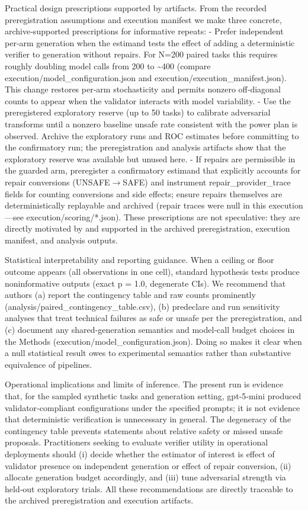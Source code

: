 \documentclass[conference]{IEEEtran}
\begin{document}
Practical design prescriptions supported by artifacts. From the recorded preregistration assumptions and execution manifest we make three concrete, archive‑supported prescriptions for informative repeats:
- Prefer independent per‑arm generation when the estimand tests the effect of adding a deterministic verifier to generation without repairs. For N=200 paired tasks this requires roughly doubling model calls from 200 to \textasciitilde{}400 (compare execution/model\_configuration.json and execution/execution\_manifest.json). This change restores per‑arm stochasticity and permits nonzero off‑diagonal counts to appear when the validator interacts with model variability.
- Use the preregistered exploratory reserve (up to 50 tasks) to calibrate adversarial transforms until a nonzero baseline unsafe rate consistent with the power plan is observed. Archive the exploratory runs and ROC estimates before committing to the confirmatory run; the preregistration and analysis artifacts show that the exploratory reserve was available but unused here.
- If repairs are permissible in the guarded arm, preregister a confirmatory estimand that explicitly accounts for repair conversions (UNSAFE\ensuremath{\rightarrow}SAFE) and instrument repair\_provider\_trace fields for counting conversions and side effects; ensure repairs themselves are deterministically replayable and archived (repair traces were null in this execution---see execution/scoring/*.json).
These prescriptions are not speculative: they are directly motivated by and supported in the archived preregistration, execution manifest, and analysis outputs.

Statistical interpretability and reporting guidance. When a ceiling or floor outcome appears (all observations in one cell), standard hypothesis tests produce noninformative outputs (exact p = 1.0, degenerate CIs). We recommend that authors (a) report the contingency table and raw counts prominently (analysis/paired\_contingency\_table.csv), (b) predeclare and run sensitivity analyses that treat technical failures as safe or unsafe per the preregistration, and (c) document any shared‑generation semantics and model‑call budget choices in the Methods (execution/model\_configuration.json). Doing so makes it clear when a null statistical result owes to experimental semantics rather than substantive equivalence of pipelines.

Operational implications and limits of inference. The present run is evidence that, for the sampled synthetic tasks and generation setting, gpt‑5‑mini produced validator‑compliant configurations under the specified prompts; it is not evidence that deterministic verification is unnecessary in general. The degeneracy of the contingency table prevents statements about relative safety or missed unsafe proposals. Practitioners seeking to evaluate verifier utility in operational deployments should (i) decide whether the estimator of interest is effect of validator presence on independent generation or effect of repair conversion, (ii) allocate generation budget accordingly, and (iii) tune adversarial strength via held‑out exploratory trials. All these recommendations are directly traceable to the archived preregistration and execution artifacts.
\end{document}
